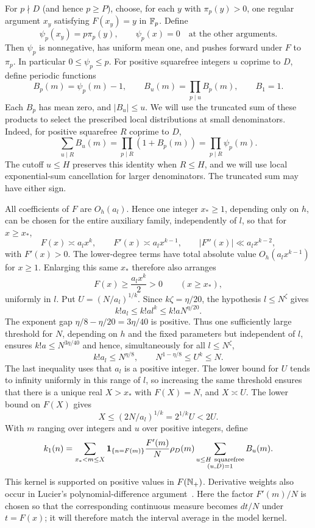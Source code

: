 For $p\nmid D$ (and hence $p\ge P$), choose, for each $y$ with
$\pi_p(y)>0$, one regular
argument $x_y$ satisfying $F(x_y)=y$ in $\mathbb F_p$. Define
\[
 \psi_p(x_y)=p\pi_p(y),\qquad \psi_p(x)=0
       \quad\text{at the other arguments}.
\]
Then $\psi_p$ is nonnegative, has uniform mean one, and pushes forward
under $F$ to $\pi_p$. In particular $0\le\psi_p\le p$. For positive
squarefree integers $u$ coprime to $D$, define periodic functions
\[
 B_p(m)=\psi_p(m)-1,\qquad
 B_u(m)=\prod_{p\mid u}B_p(m),\qquad B_1=1.
\]
Each $B_p$ has mean zero, and $|B_u|\le u$. We will use the truncated
sum of these products to select the prescribed local distributions at
small denominators. Indeed, for positive squarefree $R$ coprime to $D$,
\[
 \sum_{u\mid R}B_u(m)=\prod_{p\mid R}(1+B_p(m))
                    =\prod_{p\mid R}\psi_p(m).
\]
The cutoff $u\le H$ preserves this identity when $R\le H$, and we
will use local exponential-sum cancellation for larger denominators.
The truncated sum may have either sign.

All coefficients of $F$ are $O_h(a_l)$. Hence one integer $x_*\ge1$,
depending only on $h$, can be chosen for the entire auxiliary family,
independently of $l$, so that for $x\ge x_*$,
\[
 F(x)\asymp a_lx^k,\qquad F'(x)\asymp a_lx^{k-1},\qquad
 |F''(x)|\ll a_lx^{k-2},
\]
with $F'(x)>0$. The lower-degree terms have total absolute value
$O_h(a_lx^{k-1})$ for $x\ge1$. Enlarging this same $x_*$ therefore also
arranges
\[
 F(x)\ge \frac{a_lx^k}{2}>0\qquad(x\ge x_*),
\]
uniformly in $l$. Put $U=(N/a_l)^{1/k}$. Since $k\zeta=\eta/20$,
the hypothesis $l\le N^\zeta$ gives
\[
 k!a_l\le k!a l^k\le k!a N^{\eta/20}.
\]
The exponent gap $\eta/8-\eta/20=3\eta/40$ is positive. Thus one
sufficiently large threshold for $N$, depending on $h$ and the fixed
parameters but independent of $l$, ensures $k!a\le N^{3\eta/40}$ and hence,
simultaneously for all $l\le N^\zeta$,
\[
 k!a_l\le N^{\eta/8},\qquad
 N^{1-\eta/8}\le U^k\le N.
\]
The last inequality uses that $a_l$ is a positive integer. The lower bound
for $U$ tends to infinity uniformly in this range of $l$, so increasing the
same threshold ensures that there is a unique real $X>x_*$ with $F(X)=N$,
and $X\asymp U$. The lower bound on $F(X)$ gives
\[
 X\le (2N/a_l)^{1/k}=2^{1/k}U<2U.
\]
With $m$ ranging over integers and $u$ over positive integers, define
\begin{equation}
 k_1(n)=\sum_{x_*<m\le X}\1_{\{n=F(m)\}}\frac{F'(m)}N\rho_D(m)
             \sum_{\substack{u\le H\ \mathrm{squarefree}\\(u,D)=1}}B_u(m).
 \label{eq:17}
\end{equation}
This kernel is supported on positive
values in $F(\mathbb N_+)$. Derivative weights also occur in Lucier's
polynomial-difference argument~\cite[Section~2]{Lucier2006}.
Here the factor $F'(m)/N$ is chosen so that the
corresponding continuous measure becomes $dt/N$ under $t=F(x)$;
it will therefore match the interval average in the model kernel.

